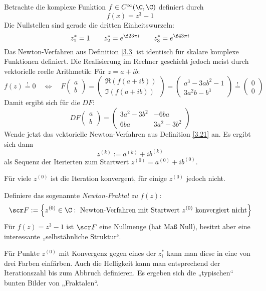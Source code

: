 \documentclass[11pt]{scrbook}
\begin{document}
\begin{ex*}
	Betrachte die komplexe Funktion $f\in C^\infty(\C, \C)$ definiert durch
	\[
		f(x) = z^3 - 1
	\]
	Die Nullstellen sind gerade die dritten Einheitswurzeln:
	\[
		z_1^* = 1  \qquad z_2^* = e^{\f 23 \pi i} \qquad z_3^* = e^{\f 43 \pi i}
	\]
	Das Newton-Verfahren aus Definition \ref{3.3} ist identisch für skalare komplexe Funktionen definiert.
	Die Realisierung im Rechner geschieht jedoch meist durch vektorielle reelle Arithmetik:
	Für $z = a+ ib$:
	\[
		f(z) \stackrel != 0  \quad \iff\quad F \begin{pmatrix}
			a \\ b
		\end{pmatrix}
		= \begin{pmatrix}
			\Re(f(a+ib)) \\ \Im(f(a+ib))
		\end{pmatrix}
		= \begin{pmatrix}
			a^3 - 3ab^2 - 1 \\
			3a^2 b - b^3
		\end{pmatrix}  \stackrel != \begin{pmatrix}
			0 \\ 0
		\end{pmatrix}
	\]
	Damit ergibt sich für die $DF$:
	\[
		DF \begin{pmatrix}
			a \\ b
		\end{pmatrix} = \begin{pmatrix}
			3a^2 - 3b^2 & -6ba \\
			6ba & 3a^2 - 3b^2
		\end{pmatrix}
	\]
	Wende jetzt das vektorielle Newton-Verfahren aus Definition \ref{3.21} an.
	Es ergibt sich dann
	\[
		z^{(k)} := a^{(k)}+ ib^{(k)}
	\]
	als Sequenz der Iterierten zum Startwert $z^{(0)} = a^{(0)} +ib^{(0)}$.

	Für viele $z^{(0)}$ ist die Iteration konvergent, für einige $z^{(0)}$ jedoch nicht.

	Definiere das sogenannte \emph{Newton-Fraktal zu $f(z)$}:
	\[
		\scr F := \Big\{ z^{(0)} \in \C : \text{ Newton-Verfahren mit Startwert $z^{(0)}$ konvergiert nicht} \Big\}
	\]
	Für $f(z) = z^3 - 1$ ist $\scr F$ eine Nullmenge (hat Maß Null), besitzt aber eine interessante „selbstähnliche Struktur“.

	Für Punkte $z^{(0)}$ mit Konvergenz gegen eines der $z_i^*$ kann man diese in eine von drei Farben einfärben.
	Auch die Helligkeit kann man entsprechend der Iterationszahl bis zum Abbruch definieren.
	Es ergeben sich die „typischen“ bunten Bilder von „Fraktalen“.
\end{ex*}
\end{document}
